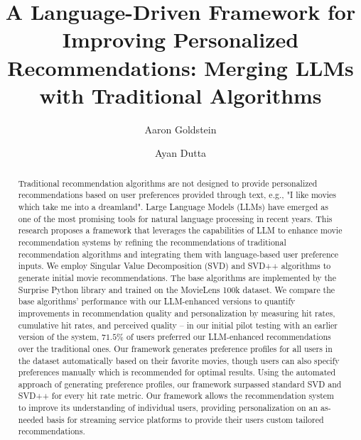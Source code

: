 \documentclass[sigconf]{acmart}
\begin{document}
\title{A Language-Driven Framework for Improving Personalized Recommendations: Merging LLMs with Traditional Algorithms}

\author{Aaron Goldstein}

\author{Ayan Dutta}


\renewcommand{\shortauthors}{Goldstein and Dutta}

\begin{abstract}
Traditional recommendation algorithms are not designed to provide personalized recommendations based on user preferences provided through text, e.g., "I like movies which take me into a dreamland". Large Language Models (LLMs) have emerged as one of the most promising tools for natural language processing in recent years. This research proposes a framework that leverages the capabilities of LLM to enhance movie recommendation systems by refining the recommendations of traditional recommendation algorithms and integrating them with language-based user preference inputs. We employ Singular Value Decomposition (SVD) and SVD++ algorithms to generate initial movie recommendations. The base algorithms are implemented by the Surprise Python library and trained on the MovieLens 100k dataset. We compare the base algorithms' performance with our LLM-enhanced versions to quantify improvements in recommendation quality and personalization by measuring hit rates, cumulative hit rates, and perceived quality -- in our initial pilot testing with an earlier version of the system, $71.5\%$ of users preferred our LLM-enhanced recommendations over the traditional ones. Our framework generates preference profiles for all users in the dataset automatically based on their favorite movies, though users can also specify preferences manually which is recommended for optimal results. Using the automated approach of generating preference profiles, our framework surpassed standard SVD and SVD++ for every hit rate metric. Our framework allows the recommendation system to improve its understanding of individual users, providing personalization on an as-needed basis for streaming service platforms to provide their users custom tailored recommendations.
\end{abstract}
\end{document}
